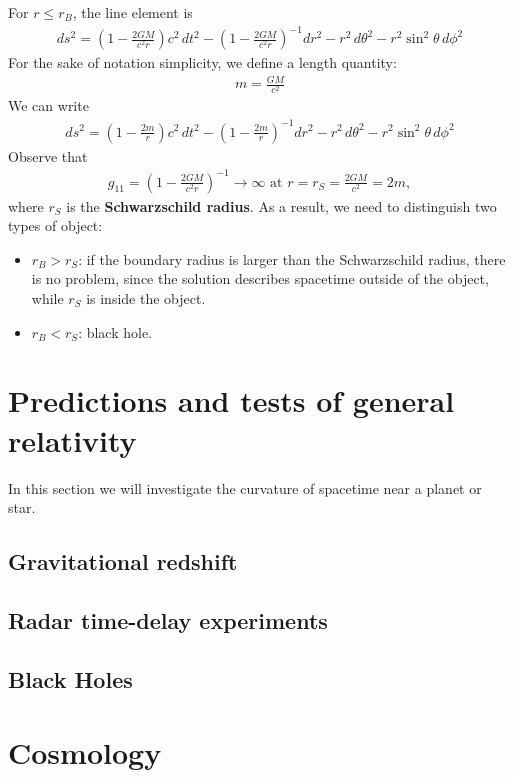 \documentclass{article}
\theoremstyle{definition}
\begin{document}
For $r \leq r_B$, the line element is
\begin{align*}
\boxed{ds^2 = \left(1 - \frac{2GM}{c^2r} \right)c^2\,dt^2 - \left(1 - \frac{2GM}{c^2r} \right)^{-1}dr^2 - r^2\,d\theta^2 - r^2\sin^2\theta\,d\phi^2}  
\end{align*}
For the sake of notation simplicity, we define a length quantity:
\begin{align*}
\boxed{m = \frac{GM}{c^2}}
\end{align*}
We can write
\begin{align*}
\boxed{ds^2 = \left(1 - \frac{2m}{r} \right)c^2\,dt^2 - \left(1 - \frac{2m}{r} \right)^{-1}dr^2 - r^2\,d\theta^2 - r^2\sin^2\theta\,d\phi^2 }
\end{align*}
Observe that
\begin{align*}
g_{11} = \left(1 - \frac{2GM}{c^2r} \right)^{-1} \rightarrow \infty \text{ at } r = r_S = \frac{2GM}{c^2} = 2m,
\end{align*}
where $r_S$ is the \textbf{Schwarzschild radius}. As a result, we need to distinguish two types of object: 
\begin{itemize}
	\item $r_B > r_S$: if the boundary radius is larger than the Schwarzschild radius, there is no problem, since the solution describes spacetime outside of the object, while $r_S$ is inside the object. 
	\item $r_B < r_S$: black hole. 
\end{itemize}


\newpage

\section{Predictions and tests of general relativity}
In this section we will investigate the curvature of spacetime near a planet or star. 
\subsection{Gravitational redshift}
\subsection{Radar time-delay experiments}
\subsection{Black Holes}

\newpage

\section{Cosmology}
\end{document}
